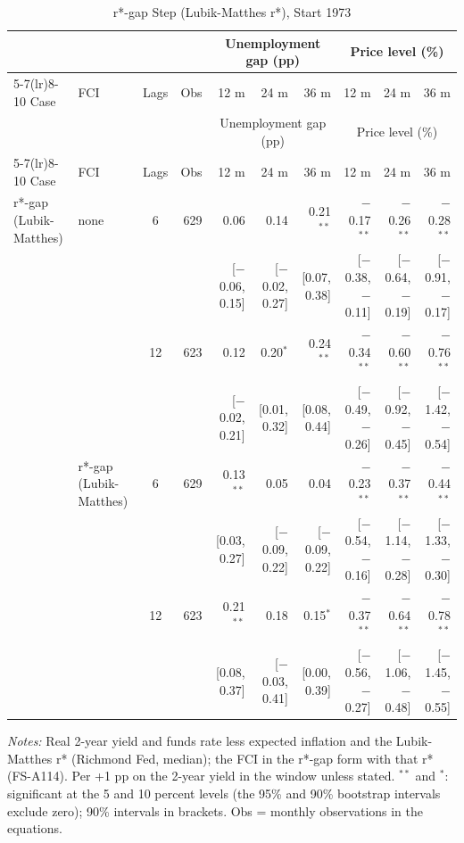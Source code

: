 \begingroup\scriptsize\setlength{\tabcolsep}{0.9pt}
\begin{longtable}{llcrrrrrrr}
\caption{r*-gap Step (Lubik-Matthes r*), Start 1973}\label{tab:appF473}\\
\toprule
 & & & & \multicolumn{3}{c}{Unemployment gap (pp)} & \multicolumn{3}{c}{Price level (\%)}\\ \cmidrule(lr){5-7}\cmidrule(lr){8-10}
Case & FCI & Lags & Obs & 12 m & 24 m & 36 m & 12 m & 24 m & 36 m\\
\midrule\endfirsthead
\toprule
 & & & & \multicolumn{3}{c}{Unemployment gap (pp)} & \multicolumn{3}{c}{Price level (\%)}\\ \cmidrule(lr){5-7}\cmidrule(lr){8-10}
Case & FCI & Lags & Obs & 12 m & 24 m & 36 m & 12 m & 24 m & 36 m\\
\midrule\endhead
\bottomrule\endfoot
r*-gap (Lubik-Matthes) & none & 6 & 629 & 0.06 & 0.14 & 0.21$^{**}$ & $-$0.17$^{**}$ & $-$0.26$^{**}$ & $-$0.28$^{**}$\\
 & & & & {\scriptsize [$-$0.06, 0.15]} & {\scriptsize [$-$0.02, 0.27]} & {\scriptsize [0.07, 0.38]} & {\scriptsize [$-$0.38, $-$0.11]} & {\scriptsize [$-$0.64, $-$0.19]} & {\scriptsize [$-$0.91, $-$0.17]}\\
 &  & 12 & 623 & 0.12 & 0.20$^{*}$ & 0.24$^{**}$ & $-$0.34$^{**}$ & $-$0.60$^{**}$ & $-$0.76$^{**}$\\
 & & & & {\scriptsize [$-$0.02, 0.21]} & {\scriptsize [0.01, 0.32]} & {\scriptsize [0.08, 0.44]} & {\scriptsize [$-$0.49, $-$0.26]} & {\scriptsize [$-$0.92, $-$0.45]} & {\scriptsize [$-$1.42, $-$0.54]}\\
 & r*-gap (Lubik-Matthes) & 6 & 629 & 0.13$^{**}$ & 0.05 & 0.04 & $-$0.23$^{**}$ & $-$0.37$^{**}$ & $-$0.44$^{**}$\\
 & & & & {\scriptsize [0.03, 0.27]} & {\scriptsize [$-$0.09, 0.22]} & {\scriptsize [$-$0.09, 0.22]} & {\scriptsize [$-$0.54, $-$0.16]} & {\scriptsize [$-$1.14, $-$0.28]} & {\scriptsize [$-$1.33, $-$0.30]}\\
 &  & 12 & 623 & 0.21$^{**}$ & 0.18 & 0.15$^{*}$ & $-$0.37$^{**}$ & $-$0.64$^{**}$ & $-$0.78$^{**}$\\
 & & & & {\scriptsize [0.08, 0.37]} & {\scriptsize [$-$0.03, 0.41]} & {\scriptsize [0.00, 0.39]} & {\scriptsize [$-$0.56, $-$0.27]} & {\scriptsize [$-$1.06, $-$0.48]} & {\scriptsize [$-$1.45, $-$0.55]}\\
\end{longtable}
\begin{flushleft}\footnotesize\textit{Notes:} Real 2-year yield and funds rate less expected inflation and the Lubik-Matthes r* (Richmond Fed, median); the FCI in the r*-gap form with that r* (FS-A114). Per +1 pp on the 2-year yield in the window unless stated. $^{**}$ and $^{*}$: significant at the 5 and 10 percent levels (the 95\% and 90\% bootstrap intervals exclude zero); 90\% intervals in brackets. Obs = monthly observations in the equations.\end{flushleft}
\endgroup
